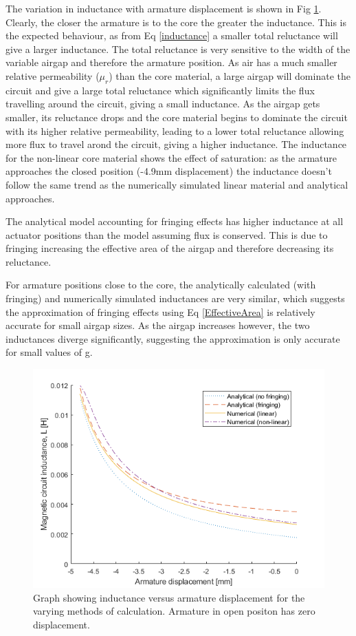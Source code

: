 \documentclass[a4paper]{IEEEtran}
\begin{document}
    The variation in inductance with armature displacement is shown in Fig \ref{inductanceGraph}. Clearly, the closer the armature is to the core the greater the inductance. This is the expected behaviour, as from Eq \ref{inductance} a smaller total reluctance will give a larger inductance. The total reluctance is very sensitive to the width of the variable airgap and therefore the armature position. As air has a much smaller relative permeability (\(\mu_r\)) than the core material, a large airgap will dominate the circuit and give a large total reluctance which significantly limits the flux travelling around the circuit, giving a small inductance. As the airgap gets smaller, its reluctance drops and the core material begins to dominate the circuit with its higher relative permeability, leading to a lower total reluctance allowing more flux to travel arond the circuit, giving a higher inductance. The inductance for the non-linear core material shows the effect of saturation: as the armature approaches the closed position (-4.9mm displacement) the inductance doesn't follow the same trend as the numerically simulated linear material and analytical approaches.

    The analytical model accounting for fringing effects has higher inductance at all actuator positions than the model assuming flux is conserved. This is due to fringing increasing the effective area of the airgap and therefore decreasing its reluctance. 
    
    For armature positions close to the core, the analytically calculated (with fringing) and numerically simulated inductances are very similar, which suggests the approximation of fringing effects using Eq \ref{EffectiveArea} is relatively accurate for small airgap sizes. As the airgap increases however, the two inductances diverge significantly, suggesting the approximation is only accurate for small values of g.

    
    \begin{figure}[htb]
        \includegraphics[width = \linewidth]{Inductances.png}
        \caption{Graph showing inductance versus armature displacement for the varying methods of calculation. Armature in open positon has zero displacement.}
        \label{inductanceGraph} 
    \end{figure}
\end{document}
